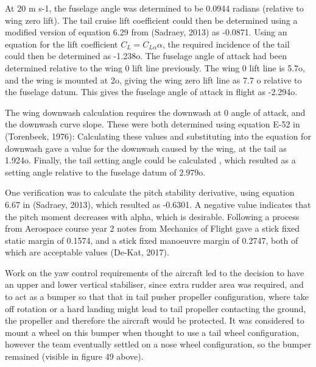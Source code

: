 \documentclass[../../main.tex]{subfiles}
\begin{document}

At 20 m s-1, the fuselage angle was determined to be 0.0944 radians (relative to wing zero lift).
The tail cruise lift coefficient could then be determined using a modified version of equation 6.29 from (Sadraey, 2013) as -0.0871.
Using an equation for the lift coefficient $C_L = C_{L\alpha}\alpha$, the required incidence of the tail could then be determined as -1.238o.
The fuselage angle of attack had been determined relative to the wing 0 lift line previously.
The wing 0 lift line is 5.7o, and the wing is mounted at 2o, giving the wing zero lift line as 7.7 o relative to the fuselage datum.
This gives the fuselage angle of attack in flight as -2.294o.  

The wing downwash calculation requires the downwash at 0 angle of attack, and the downwash curve slope.
These were both determined using equation E-52 in (Torenbeek, 1976): Calculating these values and substituting into the equation for downwash gave a value for the downwash caused by the wing, at the tail as 1.924o.
Finally, the tail setting angle could be calculated , which resulted as a setting angle relative to the fuselage datum of 2.979o. 


One verification was to calculate the pitch stability derivative, using equation 6.67 in (Sadraey, 2013), which resulted as -0.6301.
A negative value indicates that the pitch moment decreases with alpha, which is desirable.
Following a process from Aerospace course year 2 notes from Mechanics of Flight gave a stick fixed static margin of 0.1574, and a stick fixed manoeuvre margin of 0.2747, both of which are acceptable values (De-Kat, 2017). 

Work on the yaw control requirements of the aircraft led to the decision to have an upper and lower vertical stabiliser, since extra rudder area was required, and to act as a bumper so that that in tail pusher propeller configuration, where take off rotation or a hard landing might lead to tail propeller contacting the ground, the propeller and therefore the aircraft would be protected.
It was considered to mount a wheel on this bumper when thought to use a tail wheel configuration, however the team eventually settled on a nose wheel configuration, so the bumper remained (visible in figure 49 above). 
\end{document}
